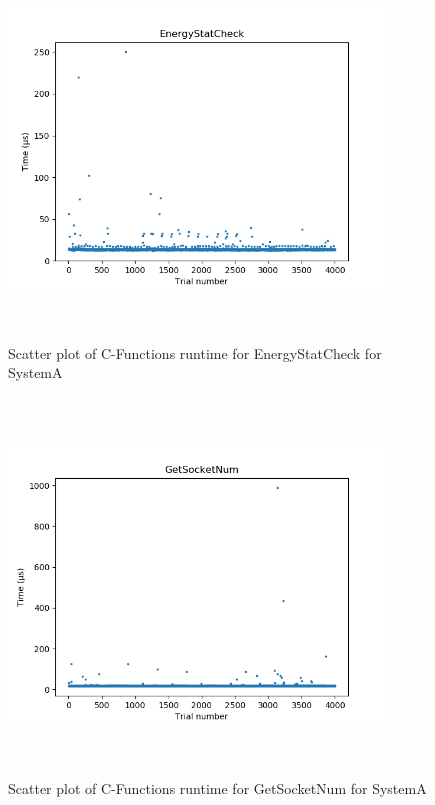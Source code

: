 \begin{figure}[H]
	\centering
	\includegraphics[width=10cm,height=10cm,keepaspectratio]{RuntimeResults_SystemA/CFunctions/EnergyStatCheck_scatter.png}
	\caption{Scatter plot of C-Functions runtime for EnergyStatCheck for SystemA}
	\label{fig:C-Functions|EnergyStatCheck|SystemA}
\end{figure}

\begin{figure}[H]
	\centering
	\includegraphics[width=10cm,height=10cm,keepaspectratio]{RuntimeResults_SystemA/CFunctions/GetSocketNum_scatter.png}
	\caption{Scatter plot of C-Functions runtime for GetSocketNum for SystemA}
	\label{fig:C-Functions|GetSocketNum|SystemA}
\end{figure}


